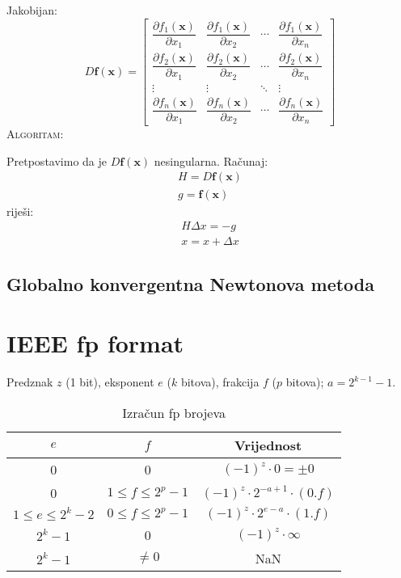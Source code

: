 \documentclass{article}
\newcommand{\doccol}{blue}
\begin{document}
Jakobijan:
$$D\mathbf f(\mathbf x) =
\begin{bmatrix}
\dfrac{\partial f_1(\mathbf x)}{\partial x_1} & \dfrac{\partial f_1(\mathbf x)}{\partial x_2} & \cdots & \dfrac{\partial f_1(\mathbf x)}{\partial x_n} \\ 
\dfrac{\partial f_2(\mathbf x)}{\partial x_1} & \dfrac{\partial f_2(\mathbf x)}{\partial x_2} & \cdots & \dfrac{\partial f_2(\mathbf x)}{\partial x_n} \\ 
\vdots &  \vdots & \ddots & \vdots \\
\dfrac{\partial f_n(\mathbf x)}{\partial x_1} & \dfrac{\partial f_n(\mathbf x)}{\partial x_2} & \cdots & \dfrac{\partial f_n(\mathbf x)}{\partial x_n}  
\end{bmatrix}$$
\textsc{Algoritam:}
\begin{algorithmic}
\EndWhile
\end{algorithmic}
Pretpostavimo da je $D\mathbf f(\mathbf x)$ nesingularna. Računaj:
\begin{align*}
H = D\mathbf f(\mathbf x) \\
g = \mathbf f(\mathbf x)
\end{align*}
riješi:
\begin{align*}
H\Delta x = -g \\
x = x+\Delta x
\end{align*}

\subsection{Globalno konvergentna Newtonova metoda}
\begin{algorithmic}
  \EndWhile
\EndFor
\end{algorithmic}

\section{IEEE fp format}
Predznak $z$ (1 bit), eksponent $e$ ($k$ bitova), frakcija $f$ ($p$ bitova); $a = 2^{k-1}-1$.
\begin{table}[!h]
\centering
\caption{Izračun fp brojeva}
\begin{tabular}{ccc}
\toprule
$e$ & $f$ & Vrijednost \\
\midrule
0 & 0 & $(-1)^z \cdot 0 = \pm 0$\\
0 & $1\le f \le 2^p-1$ & $(-1)^z \cdot 2^{-a+1}\cdot(0.f)$\\
$1\le e \le 2^k-2$ & $0\le f \le 2^p-1$ & $(-1)^z \cdot 2^{e-a}\cdot(1.f)$\\
$2^{k}-1$ & 0 & $(-1)^z \cdot \infty$\\
$2^{k}-1$ & $\neq 0$ & NaN\\
\bottomrule
\end{tabular}
\end{table}
\end{document}
